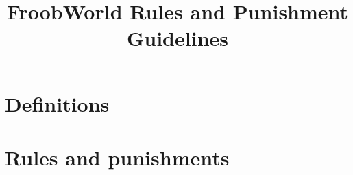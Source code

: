 \documentclass[]{article}
\title{FroobWorld Rules and Punishment Guidelines}
\begin{document}
\maketitle

\section{Definitions}

\section{Rules and punishments}
\end{document}
